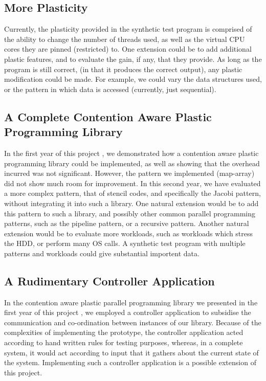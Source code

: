 \subsection{More Plasticity}
\label{section:conclusion_and_future_work:more_plasticity}

Currently, the plasticity provided in the synthetic test program is comprised of the ability to change the number of threads used, as well as the virtual CPU cores they are pinned (restricted) to. One extension could be to add additional plastic features, and to evaluate the gain, if any, that they provide. As long as the program is still correct, (in that it produces the correct output), any plastic modification could be made. For example, we could vary the data structures used, or the pattern in which data is accessed (currently, just sequential).



\subsection{A Complete Contention Aware Plastic Programming Library}
\label{section:conclusion_and_future_work:a_complete_contention_aware_plastic_parallel_programming_library}

In the first year of this project \cite{me}, we demonstrated how a contention aware plastic programming library could be implemented, as well as showing that the overhead incurred was not significant. However, the pattern we implemented (map-array) did not show much room for improvement. In this second year, we have evaluated a more complex pattern, that of stencil codes, and specifically the Jacobi pattern, without integrating it into such a library. One natural extension would be to add this pattern to such a library, and possibly other common parallel programming patterns, such as the pipeline pattern, or a recursive pattern. Another natural extension would be to evaluate more workloads, such as workloads which stress the HDD, or perform many OS calls. A synthetic test program with multiple patterns and workloads could give substantial importent data.



\subsection{A Rudimentary Controller Application}
\label{section:conclusion_and_future_work:a_rudimentary_controller_application}

In the contention aware plastic parallel programming library we presented in the first year of this project \cite{me}, we employed a controller application to subsidise the communication and co-ordination between instances of our library. Because of the complexities of implementing the prototype, the controller application acted according to hand written rules for testing purposes, whereas, in a complete system, it would act according to input that it gathers about the current state of the system. Implementing such a controller application is a possible extension of this project.



